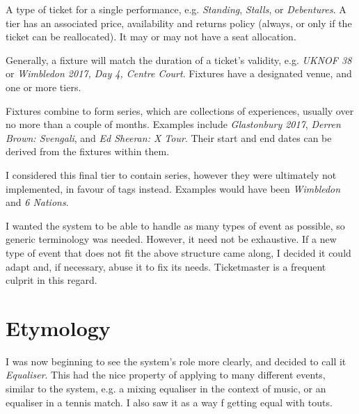 \documentclass[12pt]{bhamdissertation}
\begin{document}
\begin{description}[style=nextline]
    \item[Tiers] A type of ticket for a single performance, e.g. \textit{Standing}, \textit{Stalls}, or \textit{Debentures}. A tier has an associated price, availability and returns policy (always, or only if the ticket can be reallocated). It may or may not have a seat allocation.
    \item[Fixtures] Generally, a fixture will match the duration of a ticket's validity, e.g. \textit{UKNOF 38} or \textit{Wimbledon 2017, Day 4, Centre Court}. Fixtures have a designated venue, and one or more tiers.
    \item[Series] Fixtures combine to form series, which are collections of experiences, usually over no more than a couple of months. Examples include \textit{Glastonbury 2017}, \textit{Derren Brown: Svengali}, and \textit{Ed Sheeran: X Tour}. Their start and end dates can be derived from the fixtures within them.
    \item[Headlines] I considered this final tier to contain series, however they were ultimately not implemented, in favour of tags instead. Examples would have been \textit{Wimbledon} and \textit{6 Nations}.
\end{description}

I wanted the system to be able to handle as many types of event as possible, so generic terminology was needed. However, it need not be exhaustive. If a new type of event that does not fit the above structure came along, I decided it could adapt and, if necessary, abuse it to fix its needs. Ticketmaster is a frequent culprit in this regard.

\section{Etymology}

I was now beginning to see the system's role more clearly, and decided to call it \textit{Equaliser}. This had the nice property of applying to many different events, similar to the system, e.g. a mixing equaliser in the context of music, or an equaliser in a tennis match. I also saw it as a way f getting equal with touts.
\end{document}
